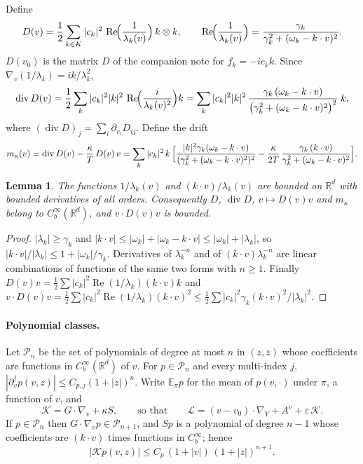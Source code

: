 \documentclass[11pt]{article}
\newcommand{\E}{\mathbb{E}}
\newcommand{\eps}{\varepsilon}
\newcommand{\cL}{\mathcal{L}}
\newcommand{\cK}{\mathcal{K}}
\newcommand{\cP}{\mathcal{P}}
\renewcommand{\Re}{\operatorname{Re}}
\newcommand{\Div}{\operatorname{div}}
\newtheorem{lemma}[theorem]{Lemma}
\theoremstyle{remark}
\begin{document}
Define
\begin{equation}
  D(v)=\frac12\sum_{k\in K}|c_k|^2\,\Re\!\Bigl(\frac1{\lambda_k(v)}\Bigr)\,k\otimes k,
  \qquad
  \Re\!\Bigl(\frac1{\lambda_k(v)}\Bigr)
   =\frac{\gamma_k}{\gamma_k^2+(\omega_k-k\cdot v)^2}.
  \label{eq:D}
\end{equation}
$D(v_0)$ is the matrix $D$ of the companion note for $f_k=-ic_kk$. Since
$\nabla_v(1/\lambda_k)=ik/\lambda_k^2$,
\begin{equation}
  \Div D(v)=\frac12\sum_k|c_k|^2|k|^2\,\Re\!\Bigl(\frac{i}{\lambda_k(v)^2}\Bigr)k
  =\sum_k|c_k|^2|k|^2\,
   \frac{\gamma_k\,(\omega_k-k\cdot v)}{\bigl(\gamma_k^2+(\omega_k-k\cdot v)^2\bigr)^2}\;k ,
  \label{eq:divD}
\end{equation}
where $(\Div D)_j=\sum_i\partial_{v_i}D_{ij}$. Define the drift
\begin{equation}
  m_\kappa(v)=\Div D(v)-\frac{\kappa}{T}\,D(v)\,v
  =\sum_k|c_k|^2\,k\,\Bigl[
    \frac{|k|^2\gamma_k(\omega_k-k\cdot v)}{(\gamma_k^2+(\omega_k-k\cdot v)^2)^2}
    -\frac{\kappa}{2T}\,\frac{\gamma_k\,(k\cdot v)}{\gamma_k^2+(\omega_k-k\cdot v)^2}\Bigr].
  \label{eq:m}
\end{equation}

\begin{lemma}\label{lem:coef}
The functions $1/\lambda_k(v)$ and $(k\cdot v)/\lambda_k(v)$ are bounded on
$\mathbb{R}^d$ with bounded derivatives of all orders. Consequently $D$,
$\Div D$, $v\mapsto D(v)v$ and $m_\kappa$ belong to
$C_b^\infty(\mathbb{R}^d)$, and $v\cdot D(v)v$ is bounded.
\end{lemma}

\begin{proof}
$|\lambda_k|\ge\gamma_k$ and
$|k\cdot v|\le|\omega_k|+|\omega_k-k\cdot v|\le|\omega_k|+|\lambda_k|$, so
$|k\cdot v|/|\lambda_k|\le1+|\omega_k|/\gamma_k$. Derivatives of
$\lambda_k^{-n}$ and of $(k\cdot v)\lambda_k^{-n}$ are linear combinations of
functions of the same two forms with $n\ge1$. Finally
$D(v)v=\frac12\sum|c_k|^2\Re(1/\lambda_k)(k\cdot v)k$ and
$v\cdot D(v)v=\frac12\sum|c_k|^2\Re(1/\lambda_k)(k\cdot v)^2
\le\frac12\sum|c_k|^2\gamma_k(k\cdot v)^2/|\lambda_k|^2$.
\end{proof}

\paragraph{Polynomial classes.} Let $\cP_n$ be the set of polynomials of
degree at most $n$ in $(z,\bar z)$ whose coefficients are functions in
$C_b^\infty(\mathbb{R}^d)$ of $v$. For $p\in\cP_n$ and every multi-index
$j$, $|\partial_v^jp(v,z)|\le C_{p,j}(1+|z|)^n$. Write $\E_\pi p$ for the
mean of $p(v,\cdot)$ under $\pi$, a function of $v$, and
\[
  \cK=G\cdot\nabla_v+\kappa S ,\qquad\text{so that}\qquad
  \cL=(v-v_0)\cdot\nabla_Y+A^v+\eps\,\cK .
\]
If $p\in\cP_n$ then $G\cdot\nabla_vp\in\cP_{n+1}$, and $Sp$ is a polynomial
of degree $n-1$ whose coefficients are $(k\cdot v)$ times functions in
$C_b^\infty$; hence
\begin{equation}
  |\cK p(v,z)|\le C_p\,(1+|v|)\,(1+|z|)^{n+1}.
  \label{eq:Kbound}
\end{equation}
\end{document}
